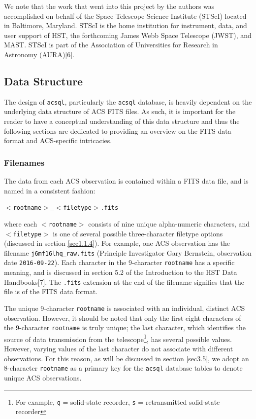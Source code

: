 \documentclass[10pt,journal,compsoc]{IEEEtran}
\begin{document}
We note that the work that went into this project by the authors was accomplished on behalf of the Space Telescope Science Institute (STScI)
located in Baltimore, Maryland.  STScI is the home institution for instrument, data, and user support of HST, the forthcoming James Webb Space
Telescope (JWST), and MAST.  STScI is part of the Association of Universities for Research in Astronomy (AURA)[6].


\subsection{Data Structure} \label{sec1.1}

The design of \texttt{acsql}, particularly the \texttt{acsql} database, is heavily dependent on the underlying data structure of ACS FITS files.
As such, it is important for the reader to have a conceptual understanding of this data structure and thus the following sections are dedicated to
providing an overview on the FITS data format and ACS-specific intricacies.


\subsubsection{Filenames} \label{sec1.1.1}

The data from each ACS observation is contained within a FITS data file, and is named in a consistent fashion:\newline

\texttt{$<$rootname$>$\_$<$filetype$>$.fits}\newline

\noindent where each \texttt{$<$rootname$>$} consists of nine unique alpha-numeric characters, and \texttt{$<$filetype$>$} is one of several possible
three-character filetype options (discussed in section \ref{sec1.1.4}).  For example, one ACS observation has the filename \texttt{j6mf16lhq\_raw.fits}
(Principle Investigator Gary Bernstein, observation date \texttt{2016-09-22}).  Each character in the 9-character \texttt{rootname} has a specific meaning,
and is discussed in section 5.2 of the Introduction to the HST Data Handbooks[7].  The \texttt{.fits} extension at the end of the filename signifies
that the file is of the FITS data format.

The unique 9-character \texttt{rootname} is associated with an individual, distinct ACS observation. However, it should be noted that only the first
eight characters of the 9-character \texttt{rootname} is truly unique; the last character, which identifies the source of data transmission from the
telescope\footnote{For example, \texttt{q} = solid-state recorder, \texttt{s} = retransmitted solid-state recorder}, has several possible values.  However,
varying values of the last character do not associate with different observations.  For this reason, as will be discussed in section \ref{sec3.5}, we adopt
an 8-character \texttt{rootname} as a primary key for the \texttt{acsql} database tables to denote unique ACS observations.
\end{document}
